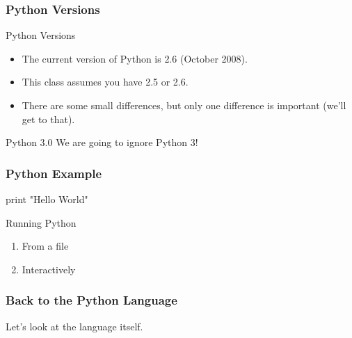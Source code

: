 \begin{frame}
\frametitle{Python Versions}

\begin{block}{Python Versions}
\begin{itemize}
\item The current version of Python is \alert{2.6} (October 2008).
\item This class assumes you have 2.5 or 2.6.
\item There are some small differences, but only one difference is important (we'll get to that).
\end{itemize}
\end{block}

\begin{block}{Python 3.0}
We are going to ignore Python 3!
\end{block}
\end{frame}

\begin{frame}[fragile]
\frametitle{Python Example}

\begin{python}
print "Hello World"
\end{python}
\end{frame}


\begin{frame}[fragile]

\begin{block}{Running Python}
\begin{enumerate}
\item From a file
\item Interactively
\end{enumerate}
\end{block}

\end{frame}

\begin{frame}[fragile]
\frametitle{Back to the Python Language}
Let's look at the language itself.
\end{frame}


